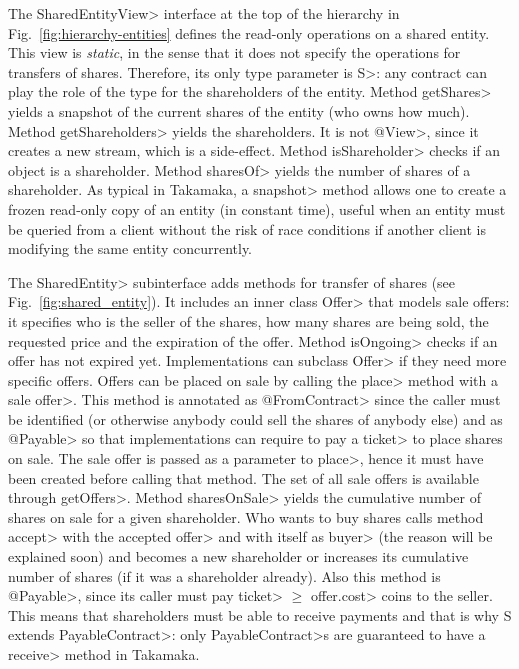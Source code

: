 The \<SharedEntityView> interface at the top of the hierarchy in Fig.~\ref{fig:hierarchy-entities}
defines the read-only operations on a shared entity. This view is \emph{static}, in the sense that it
does not specify the operations for transfers of shares. Therefore, its only type parameter is \<S>:
any contract can play the role of the type for the shareholders of the entity.
Method \<getShares> yields a snapshot of the
current shares of the entity (who owns how much). Method \<getShareholders> yields the shareholders.
It is not \<@View>, since it creates a new stream, which is a side-effect.
Method \<isShareholder> checks if an object is a shareholder. Method \<sharesOf> yields
the number of shares of a shareholder. As typical in Takamaka, a \<snapshot> method allows one
to create a frozen read-only copy of an entity (in constant time), useful when an entity must be queried from
a client without the risk of race conditions if another client is modifying the same entity concurrently.

The \<SharedEntity> subinterface adds methods for transfer of shares
(see Fig.~\ref{fig:shared_entity}).
It includes an inner class \<Offer> that models sale offers:
it specifies who is the seller of the shares,
how many shares are being sold, the requested price and the expiration of the offer.
Method \<isOngoing> checks if an offer has not expired yet.
Implementations can subclass \<Offer> if they need more specific offers.
Offers can be placed on sale
by calling the \<place> method with a sale \<offer>.
This method is annotated as \<@FromContract> since the caller must be
identified (or otherwise anybody could sell the shares of anybody else) and
as \<@Payable> so that implementations can require
to pay a \<ticket> to place shares on sale.
The sale offer is passed as a parameter to \<place>, hence it must have been created before calling that method.
The set of all sale offers is available through \<getOffers>. Method \<sharesOnSale> yields the
cumulative number of shares on sale for a given shareholder.
Who wants to buy shares calls method \<accept> with the accepted \<offer>
and with itself as \<buyer> (the reason will be explained soon)
and becomes a new shareholder or increases
its cumulative number of shares (if it was a shareholder already).
Also this method is \<@Payable>, since its caller must pay \<ticket> $\ge$ \<offer.cost>
coins to the seller.
This means that shareholders must be able to receive payments and that
is why \<S extends PayableContract>: only \<PayableContract>s are guaranteed to have a
\<receive> method in Takamaka.

